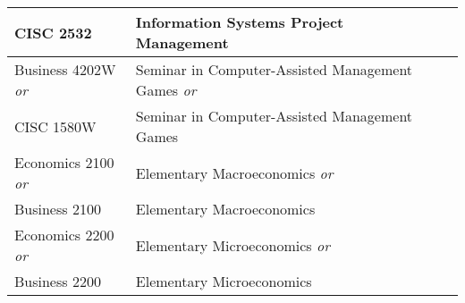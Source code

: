 \documentclass{article}
\begin{document}
\begin{Form}
\begin{longtable}{ |p{3.27cm}|p{6cm}|p{4.8cm}|p{2.3cm}|  }
		CISC 2532                & Information Systems Project Management                     & \TextField[name=2532_instructor,width=4.8cm,charsize=8pt,bordercolor=1 1 1,borderstyle=U]{}  & \TextField[name=2532_grade,width=2.2cm,charsize=8pt,bordercolor=1 1 1]{{}}  \\
		\hline

		Business 4202W \emph{or} & Seminar in Computer-Assisted Management Games \emph{or}    & \TextField[name=4202W_instructor,width=4.8cm,charsize=8pt,bordercolor=1 1 1,borderstyle=U]{} & \TextField[name=4202W_grade,width=2.2cm,charsize=8pt,bordercolor=1 1 1]{{}} \\

		CISC 1580W               & Seminar in Computer-Assisted Management Games              & \TextField[name=1580W_instructor,width=4.8cm,charsize=8pt,bordercolor=1 1 1,borderstyle=U]{} & \TextField[name=1580W_grade,width=2.2cm,charsize=8pt,bordercolor=1 1 1]{{}} \\
		\hline

		Economics 2100 \emph{or} & Elementary Macroeconomics \emph{or}                        & \TextField[name=e2100_instructor,width=4.8cm,charsize=8pt,bordercolor=1 1 1,borderstyle=U]{} & \TextField[name=e2100_grade,width=2.2cm,charsize=8pt,bordercolor=1 1 1]{{}} \\

		Business 2100            & Elementary Macroeconomics                                  & \TextField[name=b2100_instructor,width=4.8cm,charsize=8pt,bordercolor=1 1 1,borderstyle=U]{} & \TextField[name=b2100_grade,width=2.2cm,charsize=8pt,bordercolor=1 1 1]{{}} \\
		\hline
		Economics 2200 \emph{or} & Elementary Microeconomics \emph{or}                        & \TextField[name=e2200_instructor,width=4.8cm,charsize=8pt,bordercolor=1 1 1,borderstyle=U]{} & \TextField[name=e2200_grade,width=2.2cm,charsize=8pt,bordercolor=1 1 1]{{}} \\

		Business 2200            & Elementary Microeconomics                                  & \TextField[name=b2200_instructor,width=4.8cm,charsize=8pt,bordercolor=1 1 1,borderstyle=U]{} & \TextField[name=b2200_grade,width=2.2cm,charsize=8pt,bordercolor=1 1 1]{{}} \\
		\hline


\end{longtable}
\end{Form}
\end{document}
